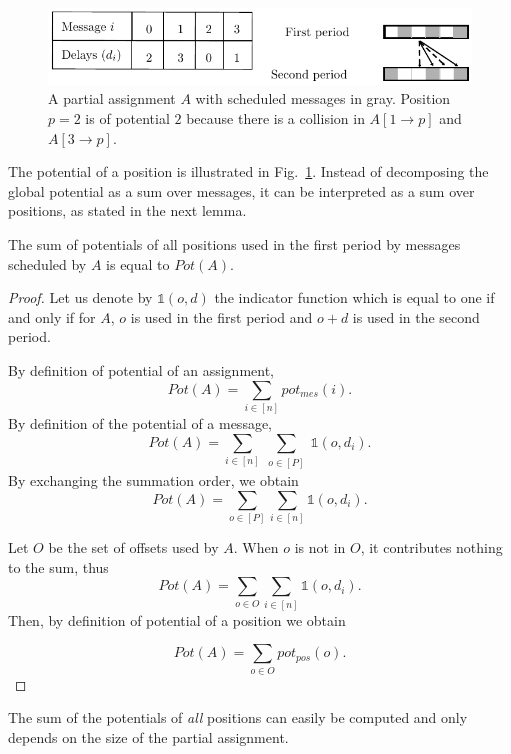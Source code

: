 \documentclass[a4paper,UKenglish,cleveref, autoref, thm-restate]{lipics-v2019}
\begin{document}
\begin{figure}
\begin{center}
\includegraphics[scale=1]{positionspotential}
\end{center}
\caption{A partial assignment $A$ with scheduled messages in gray. Position $p=2$ is of potential $2$ because there is a collision in $A[1 \rightarrow p]$ and  $A[3 \rightarrow p]$.}
\label{fig:positionpotential}
\end{figure}

The potential of a position is illustrated in Fig.~\ref{fig:positionpotential}.
Instead of decomposing the global potential as a sum over messages, it can be interpreted
as a sum over positions, as stated in the next lemma.

\begin{lemma}\label{lemma:pot_pos}
The sum of potentials of all positions used in the first period by messages scheduled by $A$ is equal to $Pot(A)$.  
\end{lemma}
\begin{proof}
 Let us denote by $\mathbb{1}(o,d)$ the indicator function which is equal to one if and only if for $A$, $o$ is used in the first period and $o+d$ is used in the second period.

By definition of potential of an assignment, 
$$Pot(A) = \sum_{i \in [n]} pot_{mes}(i).$$
By definition of the potential of a message, 
$$\displaystyle{Pot(A) = \sum_{i \in [n]} \sum_{\substack{o \in [P]}} \mathbb{1}(o,d_i) }.$$
By exchanging the summation order, we obtain
$$\displaystyle{Pot(A) = \sum_{o \in [P] }\sum_{i \in [n]} \mathbb{1}(o,d_i) }.$$

Let $O$ be the set of offsets used by $A$.
When $o$ is not in $O$, it contributes nothing to the sum, thus
$$\displaystyle{Pot(A) = \sum_{o \in O} \sum_{i \in [n]} \mathbb{1}(o,d_i) }.$$
Then, by definition of potential of a position we obtain

$$\displaystyle{Pot(A) = \sum_{o \in O} pot_{pos}(o)}.$$
\end{proof}

The sum of the potentials of \emph{all} positions can easily be computed and only depends on the size of the partial assignment.
\end{document}
